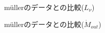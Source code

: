 \begin{figure}[htbp]
  \begin{center}
  \end{center}
  \caption{m\"{u}llerのデータとの比較($L_{\nu}$)}
  \label{fig:compare_5}
\end{figure}
\begin{figure}[htbp]
  \begin{center}
  \end{center}
  \caption{m\"{u}llerのデータとの比較($\dot{M}_{out}$)}
  \label{fig:compare_6}
\end{figure}
